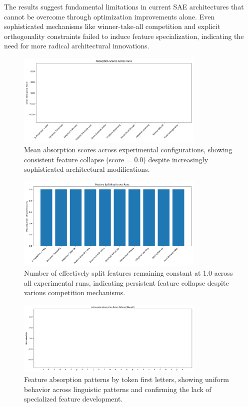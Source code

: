 \documentclass{article} %
\begin{document}
The results suggest fundamental limitations in current SAE architectures that cannot be overcome through optimization improvements alone. Even sophisticated mechanisms like winner-take-all competition and explicit orthogonality constraints failed to induce feature specialization, indicating the need for more radical architectural innovations.

\begin{figure}[h]
\centering
\includegraphics[width=0.8\textwidth]{absorption_scores.png}
\caption{Mean absorption scores across experimental configurations, showing consistent feature collapse (score = 0.0) despite increasingly sophisticated architectural modifications.}
\label{fig:absorption_scores}
\end{figure}

\begin{figure}[h]
\centering
\includegraphics[width=0.8\textwidth]{feature_splits.png}
\caption{Number of effectively split features remaining constant at 1.0 across all experimental runs, indicating persistent feature collapse despite various competition mechanisms.}
\label{fig:feature_splits}
\end{figure}

\begin{figure}[h]
\centering
\includegraphics[width=0.8\textwidth]{letter_absorption.png}
\caption{Feature absorption patterns by token first letters, showing uniform behavior across linguistic patterns and confirming the lack of specialized feature development.}
\label{fig:letter_absorption}
\end{figure}
\end{document}
